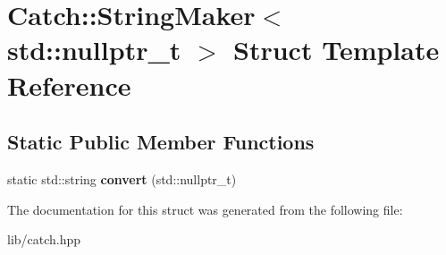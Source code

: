 \hypertarget{struct_catch_1_1_string_maker_3_01std_1_1nullptr__t_01_4}{}\section{Catch\+:\+:String\+Maker$<$ std\+:\+:nullptr\+\_\+t $>$ Struct Template Reference}
\label{struct_catch_1_1_string_maker_3_01std_1_1nullptr__t_01_4}
\subsection*{Static Public Member Functions}
\begin{DoxyCompactItemize}
\item 
\mbox{\label{struct_catch_1_1_string_maker_3_01std_1_1nullptr__t_01_4_a131fbb1f5cd68c93aaf30d34e3519e9c}} 
static std\+::string {\bfseries convert} (std\+::nullptr\+\_\+t)
\end{DoxyCompactItemize}


The documentation for this struct was generated from the following file\+:\begin{DoxyCompactItemize}
\item 
lib/catch.\+hpp\end{DoxyCompactItemize}
